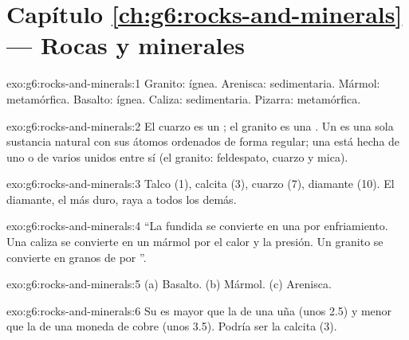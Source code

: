 \section*{Capítulo \ref{ch:g6:rocks-and-minerals} --- Rocas y minerales}

\begin{solution}{exo:g6:rocks-and-minerals:1}
Granito: ígnea. Arenisca: sedimentaria. Mármol: metamórfica. Basalto:
ígnea. Caliza: sedimentaria. Pizarra: metamórfica.
\end{solution}

\begin{solution}{exo:g6:rocks-and-minerals:2}
El cuarzo es un ; el granito es una . Un  es una sola
sustancia natural con sus átomos ordenados de forma regular; una  está
hecha de uno o de varios  unidos entre sí (el granito: feldespato,
cuarzo y mica).
\end{solution}

\begin{solution}{exo:g6:rocks-and-minerals:3}
Talco (1), calcita (3), cuarzo (7), diamante (10). El diamante, el más
duro, raya a todos los demás.
\end{solution}

\begin{solution}{exo:g6:rocks-and-minerals:4}
``La  fundida se convierte en una  por enfriamiento. Una
caliza se convierte en un mármol por el calor y la presión. Un granito se
convierte en granos de  por ''.
\end{solution}

\begin{solution}{exo:g6:rocks-and-minerals:5}
(a) Basalto. (b) Mármol. (c) Arenisca.
\end{solution}

\begin{solution}{exo:g6:rocks-and-minerals:6}
Su  es mayor que la de una uña (unos 2.5) y menor que la de una
moneda de cobre (unos 3.5). Podría ser la calcita (3).
\end{solution}

